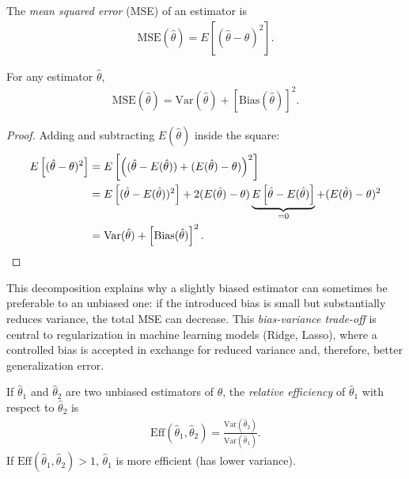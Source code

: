 \begin{definicion}
 \label{eq:6.1.2}
The \emph{mean squared error} (MSE) of an estimator is
\begin{align}
 \text{MSE}(\hat{\theta}) = E\left[(\hat{\theta}-\theta)^2\right].
\end{align}
\end{definicion}

\begin{teorema}
 \label{eq:6.1.3}
For any estimator $\hat{\theta}$,
\begin{align}
 \text{MSE}(\hat{\theta}) = \text{Var}(\hat{\theta}) + \left[\text{Bias}(\hat{\theta})\right]^2.
\end{align}
\end{teorema}

\begin{proof}
Adding and subtracting $E(\hat{\theta})$ inside the square:
\begin{align}
 E\left[(\hat{\theta}-\theta)^2\right] &= E\left[\left((\hat{\theta}-E(\hat{\theta})) + (E(\hat{\theta})-\theta)\right)^2\right] \nonumber \\
 &= E\left[(\hat{\theta}-E(\hat{\theta}))^2\right] + 2(E(\hat{\theta})-\theta)\underbrace{E\left[\hat{\theta}-E(\hat{\theta})\right]}_{=0} + (E(\hat{\theta})-\theta)^2 \nonumber \\
 &= \text{Var}(\hat{\theta}) + \left[\text{Bias}(\hat{\theta})\right]^2. \qedhere
\end{align}
\end{proof}

\begin{observacion}
This decomposition explains why a slightly biased estimator can sometimes be preferable to an unbiased one: if the introduced bias is small but substantially reduces variance, the total MSE can decrease. This \emph{bias-variance trade-off} is central to regularization in machine learning models (Ridge, Lasso), where a controlled bias is accepted in exchange for reduced variance and, therefore, better generalization error.
\end{observacion}

\begin{definicion}
 \label{eq:6.1.4}
If $\hat{\theta}_1$ and $\hat{\theta}_2$ are two unbiased estimators of $\theta$, the \emph{relative efficiency} of $\hat{\theta}_1$ with respect to $\hat{\theta}_2$ is
\begin{align}
 \text{Eff}(\hat{\theta}_1, \hat{\theta}_2) = \frac{\text{Var}(\hat{\theta}_2)}{\text{Var}(\hat{\theta}_1)}.
\end{align}
If $\text{Eff}(\hat{\theta}_1,\hat{\theta}_2) > 1$, $\hat{\theta}_1$ is more efficient (has lower variance).
\end{definicion}

